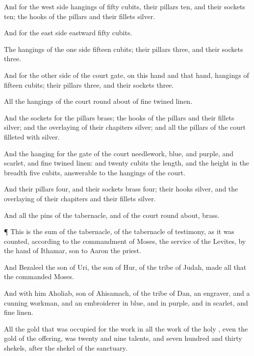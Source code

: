 {And for the
west
side
{}
hangings of
fifty
cubits, their
pillars
ten, and their
sockets
ten; the
hooks of the
pillars and their
fillets
{}
silver.

And for the
east
side
eastward
fifty
cubits.

The
hangings of the one
side
{}
fifteen
cubits; their
pillars
three, and their
sockets
three.

And for the
other
side of the
court
gate, on this hand and that hand,
{}
hangings of
fifteen
cubits; their
pillars
three, and their
sockets
three.

All the
hangings of the
court round
about
{} of fine
twined
linen.

And the
sockets for the
pillars
{}
brass; the
hooks of the
pillars and their
fillets
{}
silver; and the
overlaying of their
chapiters
{}
silver; and all the
pillars of the
court
{}
filleted with
silver.

And the
hanging for the
gate of the
court
{}
needlework,
{}
blue, and
purple, and
scarlet, and fine
twined
linen: and
twenty
cubits
{} the
length, and the
height in the
breadth
{}
five
cubits,
answerable to the
hangings of the
court.

And their
pillars
{}
four, and their
sockets
{}
brass
four; their
hooks
{}
silver, and the
overlaying of their
chapiters and their
fillets
{}
silver.

And all the
pins of the
tabernacle, and of the
court round
about,
{}
brass.


\par }{\PP {}¶
This is the
sum of the
tabernacle,
{} of the
tabernacle of
testimony, as it was
counted, according to the
commandment of
Moses,
{} the
service of the
Levites, by the
hand of
Ithamar,
son to
Aaron the
priest.

And
Bezaleel the
son of
Uri, the
son of
Hur, of the
tribe of
Judah,
made all that the
{}
commanded
Moses.

And with him
{}
Aholiab,
son of
Ahisamach, of the
tribe of
Dan, an
engraver, and a cunning
workman, and an
embroiderer in
blue, and in
purple, and in
scarlet, and fine
linen.

All the
gold that was
occupied for the
work in all the
work of the
holy
{}, even the
gold of the
offering, was
twenty and
nine
talents, and
seven
hundred and
thirty
shekels, after the
shekel of the
sanctuary.

}
